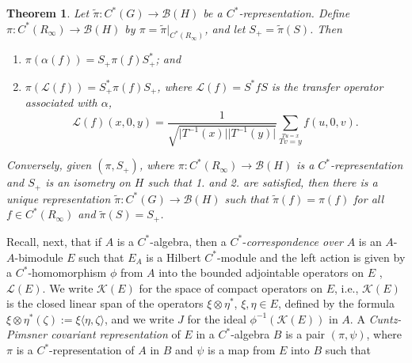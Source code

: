 \documentclass{amsproc}
\theoremstyle{plain}
\newtheorem{thm}{Theorem}[section]
\theoremstyle{definition}
\theoremstyle{definition}
\theoremstyle{remark}
\theoremstyle{plain}
\begin{document}
\begin{thm}
\label{StaceyXpdRep}Let $\tilde{\pi}:C^{\ast}(G)\to\mathcal{B}(H)$
be a $C^{*}$-representation. Define $\pi:C^{\ast}(R_{\infty})\to\mathcal{B}(H)$
by $\pi=\tilde{\pi}|_{C^{\ast}(R_{\infty})}$, and let $S_{+}=\tilde{\pi}(S)$.
Then 
\begin{enumerate}
\item $\pi(\alpha(f))=S_{+}\pi(f)S_{+}^{*}$; and 
\item $\pi(\mathcal{L}(f))=S_{+}^{\ast}\pi(f)S_{+}$, where
$\mathcal{L}(f)=S^{\ast}fS$
is the transfer operator associated with $\alpha$, \begin{equation}
\mathcal{L}(f)(x,0,y)=\frac{1}{\sqrt{\vert T^{-1}(x)\vert\vert
T^{-1}(y)\vert}}\sum_{\stackrel{Tu=x}{Tv=y}}f(u,0,v).\label{eq:transferinfty}
\end{equation}

\end{enumerate}
Conversely, given $(\pi,S_{+})$, where
$\pi:C^{\ast}(R_{\infty})\to\mathcal{B}(H)$
is a $C^{*}$-representation and $S_{+}$ is an isometry on $H$ such
that 1. and 2. are satisfied, then there is a unique representation
$\tilde{\pi}:C^{\ast}(G)\to\mathcal{B}(H)$ such that $\tilde{\pi}(f)=\pi(f)$
for all $f\in C^{\ast}(R_{\infty})$ and $\tilde{\pi}(S)=S_{+}$.
\end{thm}
Recall, next, that if $A$ is a $C^{*}$-algebra, then a
$C^{*}$-\emph{correspondence
over} $A$ is an $A$-$A$-bimodule $E$ such that $E_{A}$ is a Hilbert
$C^{*}$-module and the left action is given by a $C^{*}$-homomorphism
$\phi$ from $A$ into the bounded adjointable operators on $E$ \cite{MS98},
$\mathcal{L}(E)$. We write $\mathcal{K}(E)$ for the space of compact
operators on $E$, i.e., $\mathcal{K}(E)$ is the closed linear span
of the operators $\xi\otimes\eta^{*}$, $\xi,\eta\in E$, defined
by the formula $\xi\otimes\eta^{*}(\zeta):=\xi\langle\eta,\zeta\rangle$,
and we write $J$ for the ideal $\phi^{-1}(\mathcal{K}(E))$ in $A$.
A \emph{Cuntz-Pimsner covariant representation} of $E$ in a $C^{*}$-algebra
$B$ is a pair $(\pi,\psi)$, where $\pi$ is a $C^{*}$-representation
of $A$ in $B$ and $\psi$ is a map from $E$ into $B$ such that 
\end{document}
